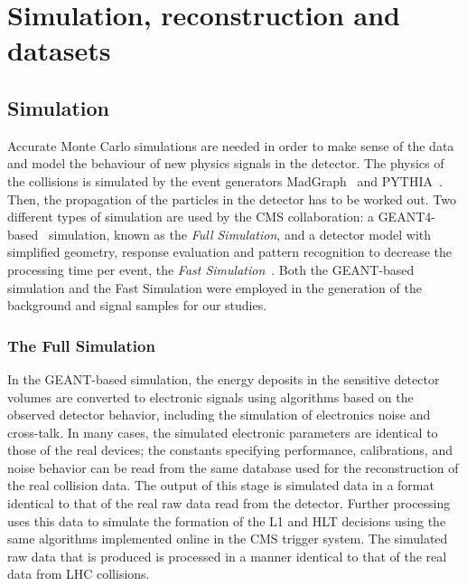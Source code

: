 \chapter{Simulation, reconstruction and datasets}
\section{Simulation}\label{sec:fast_sim}
Accurate Monte Carlo simulations are needed in order to make sense of the
data and model the behaviour of new physics signals in the detector. The physics of the collisions is
simulated by the event generators MadGraph~\cite{madgraph} and PYTHIA~\cite{fs:pythia}. Then, the propagation of the particles in the detector has to be worked out.
Two different types of simulation are used by the CMS collaboration: a
GEANT4-based~\cite{fs:geant} simulation, known as the \emph{Full
Simulation}, and a detector model with simplified geometry, response
evaluation and pattern recognition to decrease the processing time per
event, the \emph{Fast Simulation}~\cite{fs:fast.simulation}. Both the
GEANT-based simulation and the Fast Simulation were employed in the generation of the background
and signal samples for our studies.

\subsection{The Full Simulation}
In the GEANT-based simulation, the energy deposits in the sensitive detector volumes are converted to electronic
signals using algorithms based on the observed detector behavior, including the simulation of
electronics noise and cross-talk. In many cases, the simulated electronic parameters are identical to
those of the real devices; the constants specifying performance, calibrations, and noise behavior
can be read from the same database used for the reconstruction of the real collision data. The output of
this stage is simulated data in a format identical to that of the real raw data read from the detector.
Further processing uses this data to simulate the formation of the L1 and
HLT decisions using the same algorithms implemented online in the CMS trigger system. The simulated
raw data that is produced is processed in a manner identical to that of the real data from
LHC collisions.

